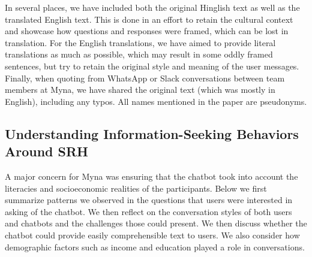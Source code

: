 In several places, we have included both the original Hinglish text as well as the translated English text. This is done in an effort to retain the cultural context and showcase how questions and responses were framed, which can be lost in translation. For the English translations, we have aimed to provide literal translations as much as possible, which may result in some oddly framed sentences, but try to retain the original style and meaning of the user messages. Finally, when quoting from WhatsApp or Slack conversations between team members at Myna, we have shared the original text (which was mostly in English), including any typos. All names mentioned in the paper are pseudonyms.


\subsection{Understanding Information-Seeking Behaviors Around SRH}
A major concern for Myna was ensuring that the chatbot took into account the literacies and socioeconomic realities of the participants. 
Below we first summarize patterns we observed in the questions that users were interested in asking of the chatbot. We then reflect on the conversation styles of both users and chatbots and the challenges those could present. We then discuss whether the chatbot could provide easily comprehensible text to users. We also consider how demographic factors such as income and education played a role in conversations.

